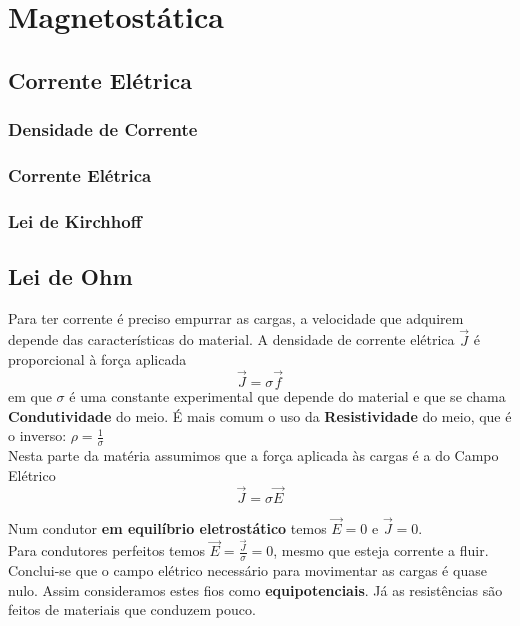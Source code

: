 \documentclass[11pt]{article}
\begin{document}
\section{Magnetostática}

\subsection{Corrente Elétrica}

\subsubsection{Densidade de Corrente}

\subsubsection{Corrente Elétrica}

\subsubsection{Lei de Kirchhoff}

\subsection{Lei de Ohm}

Para ter corrente é preciso empurrar as cargas, a velocidade que adquirem depende das características do material. A densidade de corrente elétrica $\overrightarrow{J}$ é proporcional à força aplicada
\[ \overrightarrow{J} = \sigma \overrightarrow{f}\]
em que $\sigma$ é uma constante experimental que depende do material e que se chama \textbf{Condutividade} do meio. É mais comum o uso da \textbf{Resistividade} do meio, que é o inverso: $\displaystyle \rho = \frac{1}{\sigma}$\\

Nesta parte da matéria assumimos que a força aplicada às cargas é a do Campo Elétrico
\[ \overrightarrow{J} = \sigma \overrightarrow{E}\]

Num condutor \textbf{em equilíbrio eletrostático} temos $\overrightarrow{E}=0$ e $\overrightarrow{J}=0$.\\
Para condutores perfeitos temos $\displaystyle \overrightarrow{E}=\frac{\overrightarrow{J}}{\sigma}=0$, mesmo que esteja corrente a fluir.\\

Conclui-se que o campo elétrico necessário para movimentar as cargas é quase nulo. Assim consideramos estes fios como \textbf{equipotenciais}. Já as resistências são feitos de materiais que conduzem pouco.\\
\end{document}
